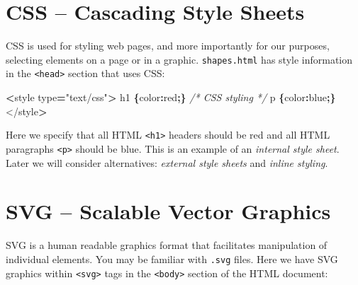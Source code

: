 \documentclass[]{book}
\newenvironment{Shaded}{\begin{snugshade}}{\end{snugshade}}
\newcommand{\CommentTok}[1]{\textcolor[rgb]{0.56,0.35,0.01}{\textit{#1}}}
\newcommand{\DataTypeTok}[1]{\textcolor[rgb]{0.13,0.29,0.53}{#1}}
\newcommand{\NormalTok}[1]{#1}
\newcommand{\OperatorTok}[1]{\textcolor[rgb]{0.81,0.36,0.00}{\textbf{#1}}}
\newcommand{\StringTok}[1]{\textcolor[rgb]{0.31,0.60,0.02}{#1}}
\begin{document}
\hypertarget{css-cascading-style-sheets}{%
\section{CSS -- Cascading Style Sheets}\label{css-cascading-style-sheets}}

CSS is used for styling web pages, and more importantly for our purposes, selecting elements on a page or in a graphic. \texttt{shapes.html} has style information in the \texttt{\textless{}head\textgreater{}} section that uses CSS:

\begin{Shaded}
\begin{Highlighting}[]
\OperatorTok{<}\NormalTok{style type}\OperatorTok{=}\StringTok{"text/css"}\OperatorTok{>}
\NormalTok{    h1 }\OperatorTok{\{}\DataTypeTok{color}\OperatorTok{:}\NormalTok{red}\OperatorTok{;\}}     \CommentTok{/* CSS styling */}
\NormalTok{    p }\OperatorTok{\{}\DataTypeTok{color}\OperatorTok{:}\NormalTok{blue}\OperatorTok{;\}}
\NormalTok{</style}\OperatorTok{>}
\end{Highlighting}
\end{Shaded}

Here we specify that all HTML \texttt{\textless{}h1\textgreater{}} headers should be red and all HTML paragraphs \texttt{\textless{}p\textgreater{}} should be blue. This is an example of an \emph{internal style sheet}. Later we will consider alternatives: \emph{external style sheets} and \emph{inline styling}.

\hypertarget{svg-scalable-vector-graphics}{%
\section{SVG -- Scalable Vector Graphics}\label{svg-scalable-vector-graphics}}

SVG is a human readable graphics format that facilitates manipulation of individual elements. You may be familiar with \texttt{.svg} files. Here we have SVG graphics within \texttt{\textless{}svg\textgreater{}} tags in the \texttt{\textless{}body\textgreater{}} section of the HTML document:
\end{document}
